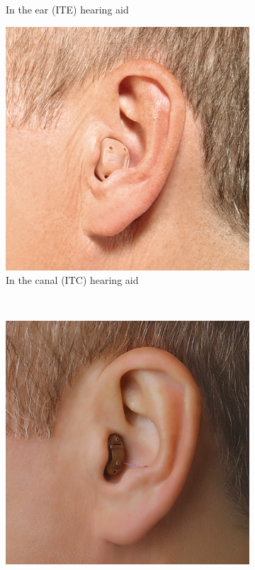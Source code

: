 \documentclass{l4proj}
\begin{document}
\begin{figure}
\begin{subfigure}[b]{0.2\textwidth}
        \caption{In the ear (ITE) hearing aid}
        \label{fig:aid2}
    \end{subfigure}
    \begin{subfigure}[b]{0.2\textwidth}
        \includegraphics[width=\textwidth]{dissertation/images/ITC.png}
        \caption{In the canal (ITC) hearing aid}
        \label{fig:aid3}
    \end{subfigure}
    ~ %
    \begin{subfigure}[b]{0.2\textwidth}
        \includegraphics[width=\textwidth]{dissertation/images/CIC.jpg}

\end{subfigure}
\end{figure}
\end{document}
